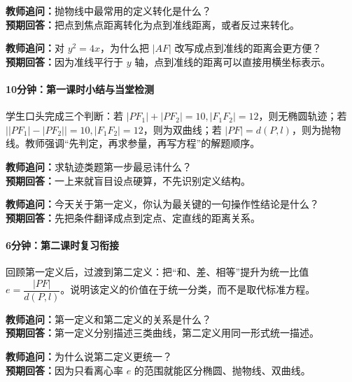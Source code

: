 \documentclass[UTF8,a4paper,11pt]{ctexart}
\begin{document}
\noindent\textbf{教师追问：}抛物线中最常用的定义转化是什么？\\

\textbf{预期回答：}把点到焦点距离转化为点到准线距离，或者反过来转化。\par

\noindent\textbf{教师追问：}对 $y^2=4x$，为什么把 $|AF|$ 改写成点到准线的距离会更方便？\\

\textbf{预期回答：}因为准线平行于 $y$ 轴，点到准线的距离可以直接用横坐标表示。\par

\paragraph{10分钟：第一课时小结与当堂检测}

学生口头完成三个判断：若 $|PF_1|+|PF_2|=10,|F_1F_2|=12$，则无椭圆轨迹；若 $\bigl||PF_1|-|PF_2|\bigr|=10,|F_1F_2|=12$，则为双曲线；若 $|PF|=d(P,l)$，则为抛物线。教师强调“先判定，再求参量，再写方程”的解题顺序。

\noindent\textbf{教师追问：}求轨迹类题第一步最忌讳什么？\\

\textbf{预期回答：}一上来就盲目设点硬算，不先识别定义结构。\par

\noindent\textbf{教师追问：}今天关于第一定义，你认为最关键的一句操作性结论是什么？\\

\textbf{预期回答：}先把条件翻译成点到定点、定直线的距离关系。\par

\paragraph{6分钟：第二课时复习衔接}

回顾第一定义后，过渡到第二定义：把“和、差、相等”提升为统一比值 $e=\dfrac{|PF|}{d(P,l)}$。说明该定义的价值在于统一分类，而不是取代标准方程。

\noindent\textbf{教师追问：}第一定义和第二定义的关系是什么？\\

\textbf{预期回答：}第一定义分别描述三类曲线，第二定义用同一形式统一描述。\par

\noindent\textbf{教师追问：}为什么说第二定义更统一？\\

\textbf{预期回答：}因为只看离心率 $e$ 的范围就能区分椭圆、抛物线、双曲线。\par
\end{document}

